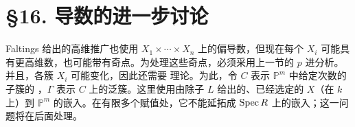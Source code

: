 \section*{§16. 导数的进一步讨论}
Faltings 给出的高维推广也使用 $X_1\times\cdots\times X_n$ 上的偏导数，但现在每个 $X_i$ 可能具有更高维数，也可能带有奇点。为处理这些奇点，必须采用上一节的 $p$ 进分析。并且，各簇 $X_i$ 可能变化，因此还需要 理论。为此，令 $C$ 表示 $\mathbb P^m$ 中给定次数的子簇的 ，$\Gamma$ 表示 $C$ 上的泛簇。这里使用由除子 $L$ 给出的、已经选定的 $X$（在 $k$ 上）到 $\mathbb P^m$ 的嵌入。在有限多个赋值处，它不能延拓成 $\operatorname{Spec} R$ 上的嵌入；这一问题将在后面处理。

